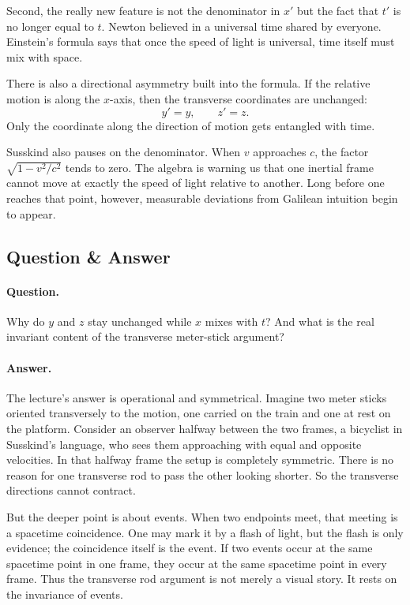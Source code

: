 Second, the really new feature is not the denominator in \(x'\) but the fact that \(t'\) is no longer equal to \(t\). Newton believed in a universal time shared by everyone. Einstein's formula says that once the speed of light is universal, time itself must mix with space.

There is also a directional asymmetry built into the formula. If the relative motion is along the \(x\)-axis, then the transverse coordinates are unchanged:
\begin{equation}
y'=y, \qquad z'=z.
\end{equation}
Only the coordinate along the direction of motion gets entangled with time.

Susskind also pauses on the denominator. When \(v\) approaches \(c\), the factor \(\sqrt{1-v^2/c^2}\) tends to zero. The algebra is warning us that one inertial frame cannot move at exactly the speed of light relative to another. Long before one reaches that point, however, measurable deviations from Galilean intuition begin to appear.

\subsection{Question \& Answer}

\paragraph{Question.} Why do \(y\) and \(z\) stay unchanged while \(x\) mixes with \(t\)? And what is the real invariant content of the transverse meter-stick argument?

\paragraph{Answer.} The lecture's answer is operational and symmetrical. Imagine two meter sticks oriented transversely to the motion, one carried on the train and one at rest on the platform. Consider an observer halfway between the two frames, a bicyclist in Susskind's language, who sees them approaching with equal and opposite velocities. In that halfway frame the setup is completely symmetric. There is no reason for one transverse rod to pass the other looking shorter. So the transverse directions cannot contract.

But the deeper point is about events. When two endpoints meet, that meeting is a spacetime coincidence. One may mark it by a flash of light, but the flash is only evidence; the coincidence itself is the event. If two events occur at the same spacetime point in one frame, they occur at the same spacetime point in every frame. Thus the transverse rod argument is not merely a visual story. It rests on the invariance of events.


